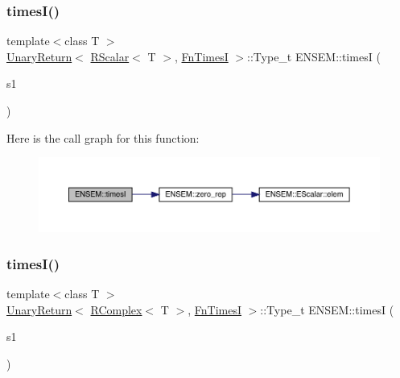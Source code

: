 \subsubsection{\texorpdfstring{timesI()}{timesI()}\hspace{0.1cm}{\footnotesize\ttfamily [1/2]}}
{\footnotesize\ttfamily template$<$class T $>$ \\
\mbox{\hyperlink{structENSEM_1_1UnaryReturn}{Unary\+Return}}$<$ \mbox{\hyperlink{classENSEM_1_1RScalar}{R\+Scalar}}$<$ T $>$, \mbox{\hyperlink{structENSEM_1_1FnTimesI}{Fn\+TimesI}} $>$\+::Type\+\_\+t E\+N\+S\+E\+M\+::timesI (\begin{DoxyParamCaption}\item[{const \mbox{\hyperlink{classENSEM_1_1RScalar}{R\+Scalar}}$<$ T $>$ \&}]{s1 }\end{DoxyParamCaption})\hspace{0.3cm}{\ttfamily [inline]}}

Here is the call graph for this function\+:\nopagebreak
\begin{figure}[H]
\begin{center}
\leavevmode
\includegraphics[width=350pt]{da/dc7/group__rcomplex_ga1741ab434937b21a3f54881161f429aa_cgraph}
\end{center}
\end{figure}
\mbox{\label{group__rcomplex_gaf442aefeacd8aece996f6a9d9028d72e}} 
\subsubsection{\texorpdfstring{timesI()}{timesI()}\hspace{0.1cm}{\footnotesize\ttfamily [2/2]}}
{\footnotesize\ttfamily template$<$class T $>$ \\
\mbox{\hyperlink{structENSEM_1_1UnaryReturn}{Unary\+Return}}$<$ \mbox{\hyperlink{classENSEM_1_1RComplex}{R\+Complex}}$<$ T $>$, \mbox{\hyperlink{structENSEM_1_1FnTimesI}{Fn\+TimesI}} $>$\+::Type\+\_\+t E\+N\+S\+E\+M\+::timesI (\begin{DoxyParamCaption}\item[{const \mbox{\hyperlink{classENSEM_1_1RComplex}{R\+Complex}}$<$ T $>$ \&}]{s1 }\end{DoxyParamCaption})\hspace{0.3cm}{\ttfamily [inline]}}

